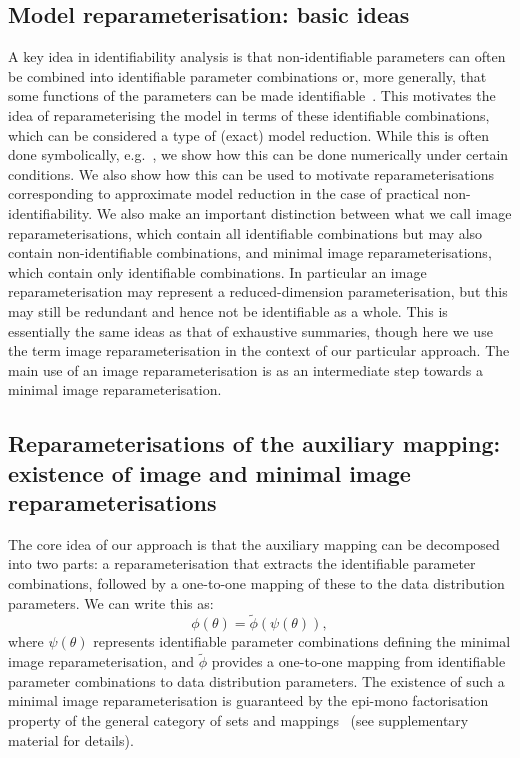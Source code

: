 \subsection{Model reparameterisation: basic ideas}
A key idea in identifiability analysis is that non-identifiable parameters can often be combined into identifiable parameter combinations or, more generally, that some functions of the parameters can be made identifiable~\cite{Maclaren2019,Cole2020}. This motivates the idea of reparameterising the model in terms of these identifiable combinations, which can be considered a type of (exact) model reduction. While this is often done symbolically, e.g.~\cite{Catchpole1997,Catchpole1998,Cole2010,Cole2020}, we show how this can be done numerically under certain conditions. We also show how this can be used to motivate reparameterisations corresponding to approximate model reduction in the case of practical non-identifiability. We also make an important distinction between what we call image reparameterisations, which contain all identifiable combinations but may also contain non-identifiable combinations, and minimal image reparameterisations, which contain only identifiable combinations. In particular an image reparameterisation may represent a reduced-dimension parameterisation, but this may still be redundant and hence not be identifiable as a whole. This is essentially the same ideas as that of exhaustive summaries, though here we use the term image reparameterisation in the context of our particular approach. The main use of an image reparameterisation is as an intermediate step towards a minimal image reparameterisation.

\subsection{Reparameterisations of the auxiliary mapping: existence of image and minimal image reparameterisations}
The core idea of our approach is that the auxiliary mapping can be decomposed into two parts: a reparameterisation that extracts the identifiable parameter combinations, followed by a one-to-one mapping of these to the data distribution parameters. We can write this as:
\begin{equation}
\phi(\theta) = \tilde{\phi}(\psi(\theta)),
\label{eq:epi-mono}
\end{equation}
where $\psi(\theta)$ represents identifiable parameter combinations defining the minimal image reparameterisation, and $\tilde{\phi}$ provides a one-to-one mapping from identifiable parameter combinations to data distribution parameters. The existence of such a minimal image reparameterisation is guaranteed by the epi-mono factorisation property of the general category of sets and mappings~\cite{Lawvere2003} (see supplementary material for details).

